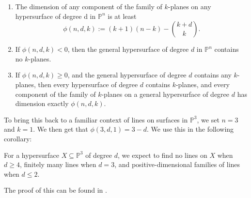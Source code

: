 \begin{corollary}

    \begin{enumerate}[label=(\alph*)]
        \item The dimension of any component of the family of $k$-planes on any hypersurface of degree d in $\mathbb{P}^n$ is at least \[\phi(n,d,k):= (k+1)(n-k)-\binom{k+d}{k}.\]
        \item If $\phi(n,d,k) < 0$, then the general hypersurface of degree $d$ in $\mathbb{P}^n$ contains no $k$-planes.
        \item If $\phi(n,d,k) \geq 0$, and the general hypersurface of degree $d$ contains any $k$-planes, then every hypersurface of degree $d$ contains $k$-planes, and every component of the family of $k$-planes on a general hypersurface of degree $d$ has dimension exactly $\phi(n,d,k)$.
    \end{enumerate}

\end{corollary}


To bring this back to a familiar context of lines on surfaces in $\mathbb{P}^3$, we set $n=3$ and $k=1$. We then get that $\phi(3,d,1) = 3-d$. We use this in the following corollary:

\begin{corollary} \label{cor:Fano}
    For a hypersurface $X \subseteq \mathbb{P}^3$ of degree $d$, we expect to find no lines on $X$ when $d \geq 4$, finitely many lines when $d=3$, and positive-dimensional families of lines when $d \leq 2$.
\end{corollary}
The proof of this can be found in \cite[Theorem A.45]{EO25}.
